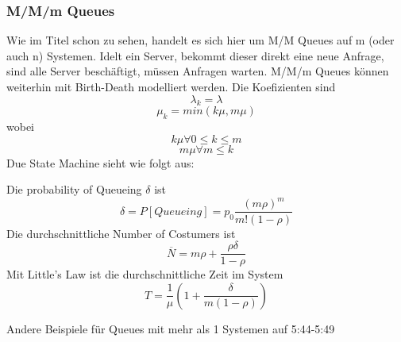 		\subsubsection{M/M/m Queues}
			Wie im Titel schon zu sehen, handelt es sich hier um M/M Queues auf m (oder auch n) Systemen. Idelt ein Server, bekommt dieser direkt eine neue Anfrage, sind alle Server beschäftigt, müssen Anfragen warten. M/M/m Queues können weiterhin mit Birth-Death modelliert werden. Die Koefizienten sind
			$$
				\lambda_k = \lambda
			$$
			$$
				\mu_k = min(k\mu,m\mu) 
			$$
			wobei
			$$
				k\mu \forall 0\le k \le m
			$$
			$$
				m\mu \forall m \le k 
			$$
			Due State Machine sieht wie folgt aus:
			\begin{center}
			\end{center} 
			Die probability of Queueing $\delta$ ist
			$$
				\delta = P[Queueing] = p_0\frac{(m\rho)^m}{m!(1-\rho)}
			$$
			Die durchschnittliche Number of Costumers ist 
			$$
				\overline{N}= m\rho + \frac{\rho \delta }{1-\rho}
			$$
			Mit Little's Law ist die durchschnittliche Zeit im System
			$$
				T=\frac{1}{\mu}\left(1+\frac{\delta}{m(1-\rho)}\right)
			$$

	Andere Beispiele für Queues mit mehr als 1 Systemen auf 5:44-5:49